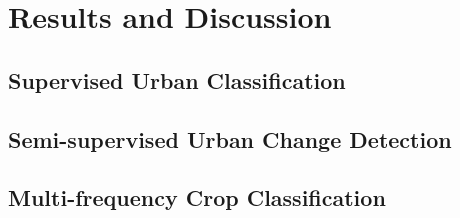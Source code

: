 \chapter{Results and Discussion}

\section{Supervised Urban Classification}  


\section{Semi-supervised Urban Change Detection} 

\section{Multi-frequency Crop Classification } 
